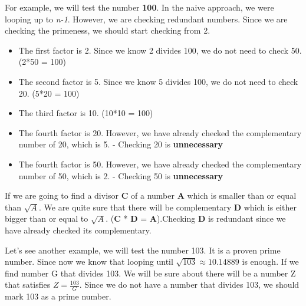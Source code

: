 \documentclass[12pt]{article}
\begin{document}
For example, we will test the number \textbf{100}. In the naive approach, we were looping up to \textit{n-1}. However, we are checking redundant numbers. Since we are checking the primeness, we should start checking from 2.
\begin{itemize}
  \item The first factor is 2. Since we know 2 divides 100, we do not need to check 50. (2*50 = 100)
  \item The second factor is 5. Since we know 5 divides 100, we do not need to check 20. (5*20 = 100)
  \item The third factor is 10. (10*10 = 100) 
  \item The fourth factor is 20. However, we have already checked the complementary number of 20, which is 5. - Checking 20 is \textbf{unnecessary}
  \item The fourth factor is 50. However, we have already checked the complementary number of 50, which is 2. - Checking 50 is \textbf{unnecessary}
\end{itemize}

If we are going to find a divisor \textbf{C} of a number \textbf{A} which is smaller than or equal than $\sqrt{A}$. We are quite sure that there will be complementary \textbf{D} which is either bigger than or equal to $\sqrt{A}$. (\textbf{C} * \textbf{D} = \textbf{A}).Checking \textbf{D} is redundant since we have already checked its complementary.

Let's see another example, we will test the number 103. It is a proven prime number. Since now we know that looping until $ \sqrt{103} \approx 10.14889 $ is enough. If we find number G that divides 103. We will be sure about there will be a number Z that satisfies $Z = \frac{103}{G}$. Since we do not have a number that divides 103, we should mark 103 as a prime number.

\clearpage
\end{document}
